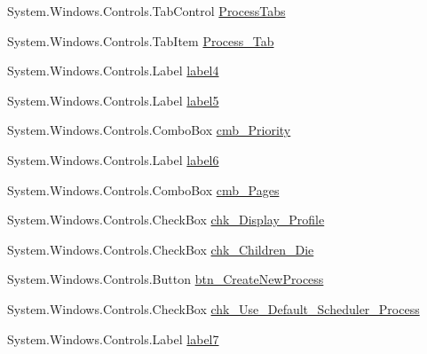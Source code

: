\begin{DoxyCompactItemize}
System.\+Windows.\+Controls.\+Tab\+Control \hyperlink{class_c_p_u___o_s___simulator_1_1_operating_system_main_window_a6e2a1da42cb207d3a02c3bc1613be085}{Process\+Tabs}
\item 
System.\+Windows.\+Controls.\+Tab\+Item \hyperlink{class_c_p_u___o_s___simulator_1_1_operating_system_main_window_a01c2d1944c9470e56e5bbbcdff683f2b}{Process\+\_\+\+Tab}
\item 
System.\+Windows.\+Controls.\+Label \hyperlink{class_c_p_u___o_s___simulator_1_1_operating_system_main_window_a11f07634242ba2c38b23b293dcd3843e}{label4}
\item 
System.\+Windows.\+Controls.\+Label \hyperlink{class_c_p_u___o_s___simulator_1_1_operating_system_main_window_a2b7721f6cfb0a1eeb4a0aec34ef543c0}{label5}
\item 
System.\+Windows.\+Controls.\+Combo\+Box \hyperlink{class_c_p_u___o_s___simulator_1_1_operating_system_main_window_a52618598a5f66eb457af669a7ca849d9}{cmb\+\_\+\+Priority}
\item 
System.\+Windows.\+Controls.\+Label \hyperlink{class_c_p_u___o_s___simulator_1_1_operating_system_main_window_ad753667e4d67f79b83e59dc8be4df684}{label6}
\item 
System.\+Windows.\+Controls.\+Combo\+Box \hyperlink{class_c_p_u___o_s___simulator_1_1_operating_system_main_window_ab8bcdf83f7bfdecbdd3f8ba71cc92a5e}{cmb\+\_\+\+Pages}
\item 
System.\+Windows.\+Controls.\+Check\+Box \hyperlink{class_c_p_u___o_s___simulator_1_1_operating_system_main_window_aa13338d96952aafec3ecbc7f4fa6fcfc}{chk\+\_\+\+Display\+\_\+\+Profile}
\item 
System.\+Windows.\+Controls.\+Check\+Box \hyperlink{class_c_p_u___o_s___simulator_1_1_operating_system_main_window_a22ea0e1679c79b12e2637f93543c0bef}{chk\+\_\+\+Children\+\_\+\+Die}
\item 
System.\+Windows.\+Controls.\+Button \hyperlink{class_c_p_u___o_s___simulator_1_1_operating_system_main_window_a30b8c5bcaa36e85ba4b41f23c1bbfdde}{btn\+\_\+\+Create\+New\+Process}
\item 
System.\+Windows.\+Controls.\+Check\+Box \hyperlink{class_c_p_u___o_s___simulator_1_1_operating_system_main_window_a8af478cc94c72b0c843b4911f43aecdf}{chk\+\_\+\+Use\+\_\+\+Default\+\_\+\+Scheduler\+\_\+\+Process}
\item 
System.\+Windows.\+Controls.\+Label \hyperlink{class_c_p_u___o_s___simulator_1_1_operating_system_main_window_ae841fdcc76cc96944b0463f3c4c448a4}{label7}
\item 

\end{DoxyCompactItemize}
